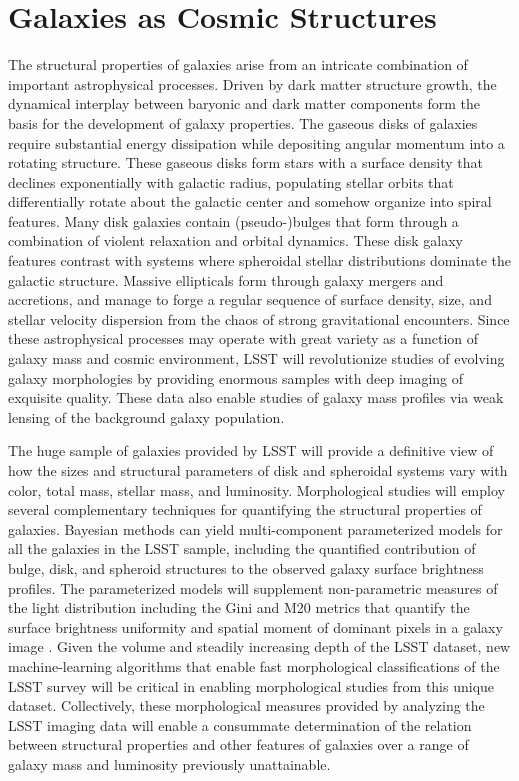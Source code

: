 {\section{Galaxies as Cosmic Structures}
\label{sec:sci:gal:bkgnd:structures}

The structural properties of galaxies arise from
an intricate combination of important astrophysical
processes. Driven by dark matter structure growth, the dynamical
interplay between baryonic and dark matter components form
the basis for the development of galaxy properties.
The gaseous disks of galaxies require
substantial energy dissipation while depositing
angular momentum into a rotating structure. These
gaseous disks form stars with a
surface density that declines exponentially with
galactic radius, populating stellar orbits that
differentially rotate about the galactic center and
somehow organize into spiral features.
Many disk galaxies contain (pseudo-)bulges that form through
a combination of violent relaxation and orbital dynamics.
These disk galaxy features contrast with systems where
spheroidal stellar distributions dominate the galactic
structure. Massive ellipticals form through galaxy
mergers and accretions, and manage to forge a regular
sequence of surface density, size, and stellar velocity
dispersion from the chaos of strong gravitational
encounters. Since these astrophysical
processes may operate with great
variety as a function of galaxy mass and
cosmic environment, LSST will revolutionize studies
of evolving galaxy morphologies by providing enormous
samples with deep imaging of exquisite quality. These data also enable 
studies of galaxy mass profiles via weak lensing of the background
galaxy population.

The huge sample of galaxies provided by LSST will
provide a definitive view of how the sizes and
structural parameters of disk and spheroidal systems
vary with color, total mass, stellar mass, and luminosity. 
Morphological studies will employ several complementary techniques for quantifying the 
structural properties of galaxies. Bayesian
methods can yield multi-component
parameterized models for all the galaxies
in the LSST sample, including the quantified
contribution of bulge, disk, and
spheroid structures to the observed galaxy
surface brightness profiles. The parameterized
models will supplement non-parametric measures
of the light distribution including the
Gini and M20 metrics that quantify the surface
brightness uniformity and spatial moment of
dominant pixels in a galaxy image \citep{abraham2003a,lotz2004a}. Given the volume 
and steadily increasing depth of the LSST dataset, 
new machine-learning algorithms \citep[e.g.][; Hausen \& Robertson, in prep]{hocking2015a} that enable fast morphological classifications of the LSST survey will be critical in enabling morphological studies from this unique dataset. Collectively, these morphological measures provided
by analyzing the LSST imaging data will enable
a consummate determination of the relation between
structural properties and other features of
galaxies over a range of galaxy mass and luminosity
previously unattainable. 

}
